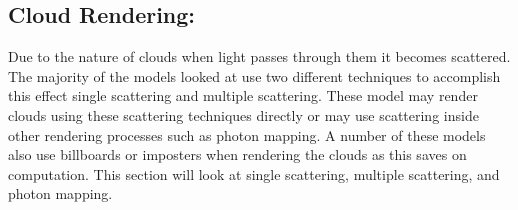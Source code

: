 \subsection{Cloud Rendering:}
\label{sec:cr}
Due to the nature of clouds when light passes through them it becomes scattered.
The majority of the models looked at use two different techniques to accomplish this effect single scattering and multiple scattering.
These model may render clouds using these scattering techniques directly or may use scattering inside other rendering processes such as photon mapping.
A number of these models also use billboards or imposters when rendering the clouds as this saves on computation.
This section will look at single scattering, multiple scattering, and photon mapping. 


